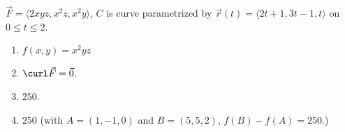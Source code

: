{$\vec F = \langle 2xyz,x^2z,x^2y\rangle$, $C$ is curve parametrized by $\vec r(t) = \langle 2t+1,3t-1,t\rangle$ on $0\leq t\leq 2$. 
}
{\begin{enumerate}
\item		$f(x,y) = x^2yz$
\item	$\curl \vec F = \vec 0$.
\item		$250$.%
\item	$250$ (with $A = (1,-1,0)$ and $B = (5,5,2)$, $f(B) - f(A) = 250$.)
\end{enumerate}
}
